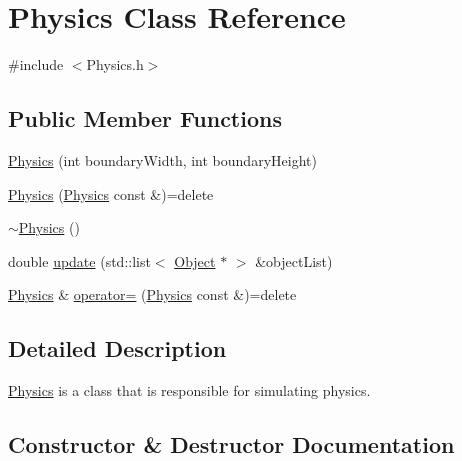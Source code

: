 \hypertarget{class_physics}{}\section{Physics Class Reference}
\label{class_physics}


{\ttfamily \#include $<$Physics.\+h$>$}

\subsection*{Public Member Functions}
\begin{DoxyCompactItemize}
\item 
\hyperlink{class_physics_a631aee9c081c557beaf73ef2e7605ecc}{Physics} (int boundary\+Width, int boundary\+Height)
\item 
\hyperlink{class_physics_a2d3d53c9563788e23d54107bca00bd50}{Physics} (\hyperlink{class_physics}{Physics} const \&)=delete
\item 
\hyperlink{class_physics_a045c3788e28059d3920136499942490f}{$\sim$\+Physics} ()
\item 
double \hyperlink{class_physics_a36b8f08b2f2152a602c3e6838806c83a}{update} (std\+::list$<$ \hyperlink{class_object}{Object} $\ast$ $>$ \&object\+List)
\item 
\hyperlink{class_physics}{Physics} \& \hyperlink{class_physics_abef573215d860511dce99eb8e4df7bc2}{operator=} (\hyperlink{class_physics}{Physics} const \&)=delete
\end{DoxyCompactItemize}


\subsection{Detailed Description}
\hyperlink{class_physics}{Physics} is a class that is responsible for simulating physics. 

\subsection{Constructor \& Destructor Documentation}
